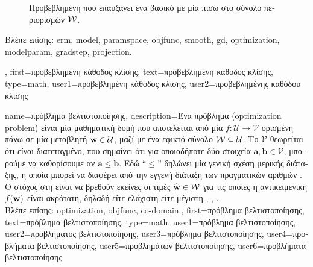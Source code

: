 {{\begin{figure}[H]
\begin{center}
		\vspace*{-5mm}
		\end{center}
		{
		\caption{\foreignlanguage{greek}{Προβεβλημένη}  \foreignlanguage{greek}{που επαυξάνει ένα βασικό} 
			 \foreignlanguage{greek}{με μία}  \foreignlanguage{greek}{πίσω στο σύνολο 
			περιορισμών} $\mathcal{W}$.}
		\label{fig_projected_GD_dict} }
		\end{figure}
		\foreignlanguage{greek}{Βλέπε επίσης:} \gls{erm}, \gls{model}, \gls{paramspace}, \gls{objfunc}, \gls{smooth}, \gls{gd}, \gls{optimization}, 
		\gls{modelparam}, \gls{gradstep}, \gls{projection}.},
	first={\foreignlanguage{greek}{προβεβλημένη κάθοδος κλίσης}},
	text={\foreignlanguage{greek}{προβεβλημένη κάθοδος κλίσης}},
	type=math,
	user1={\foreignlanguage{greek}{προβεβλημένη κάθοδος κλίσης}}, %
	user2={\foreignlanguage{greek}{προβεβλημένης καθόδου κλίσης}} %
}

{name={\foreignlanguage{greek}{πρόβλημα βελτιστοποίησης}}, 
	description={\foreignlanguage{greek}{Ένα πρόβλημα}  
		(optimization problem) \foreignlanguage{greek}{είναι μία μαθηματική δομή που αποτελείται από μία}  
		$f: \mathcal{U} \rightarrow \mathcal{V}$ \foreignlanguage{greek}{ορισμένη πάνω σε μία μεταβλητή}  
		\foreignlanguage{greek}{${\bf w} \in \mathcal{U}$, μαζί με ένα εφικτό σύνολο $\mathcal{W} \subseteq \mathcal{U}$. Το} 
		 $\mathcal{V}$ \foreignlanguage{greek}{θεωρείται ότι είναι διατεταγμένο, που σημαίνει ότι για οποιαδήποτε 
		δύο στοιχεία $\mathbf{a}, \mathbf{b} \in \mathcal{V}$, μπορούμε να καθορίσουμε αν $\mathbf{a} \leq \mathbf{b}$. 
		Εδώ ``$\leq$'' δηλώνει μία γενική σχέση μερικής διάταξης, η οποία μπορεί να διαφέρει από την εγγενή 
		διάταξη των πραγματικών αριθμών} \cite[\foreignlanguage{greek}{Ενότητα} 2.4]{BoydConvexBook}.
		\foreignlanguage{greek}{Ο στόχος στη}  \foreignlanguage{greek}{είναι να βρεθούν εκείνες οι τιμές 
		$\widehat{{\bf w}} \in \mathcal{W}$ για τις οποίες η αντικειμενική $f({\bf w})$ είναι ακρότατη, δηλαδή είτε ελάχιστη είτε μέγιστη} 
		\cite{BoydConvexBook}, \cite{BertsekasNonLinProgr}, \cite{nesterov04}.
		\\
		\foreignlanguage{greek}{Βλέπε επίσης:} \gls{optimization}, \gls{objfunc}, \gls{co-domain}.},
	first={\foreignlanguage{greek}{πρόβλημα βελτιστοποίησης}},
	text={\foreignlanguage{greek}{πρόβλημα βελτιστοποίησης}},
	type=math,
	user1={\foreignlanguage{greek}{πρόβλημα βελτιστοποίησης}}, %
  	user2={\foreignlanguage{greek}{προβλήματος βελτιστο\-ποί\-ησης}}, %
	user3={\foreignlanguage{greek}{πρόβλημα βελτιστοποίησης}}, %
	user4={\foreignlanguage{greek}{προβλήματα βελτιστοποίησης}}, %
  	user5={\foreignlanguage{greek}{προβλημάτων βελτιστο\-ποί\-ησης}}, %
	user6={\foreignlanguage{greek}{προβλήματα βελτιστοποίησης}} %
}

